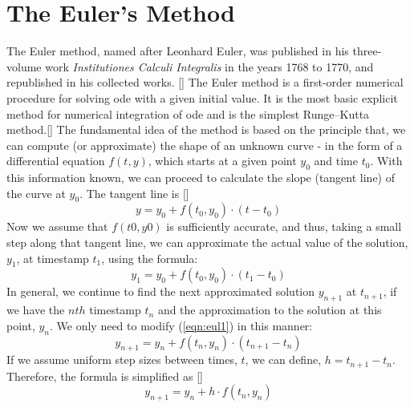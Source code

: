 \documentclass[12pt,oneside]{book}
\begin{document}
	\section{The Euler's Method} \label{m:eul}
		\begin{spacing}{1.2}
			
			The Euler method, named after Leonhard Euler, was published in his three-volume work \textit{Institutiones Calculi Integralis} in the years 1768 to 1770, and republished in his collected works.\citep{euler1913institutiones} [] The Euler method is a first-order numerical procedure for solving \ac{ode} with a given initial value. It is the most basic explicit method for numerical integration of \ac{ode} and is the simplest Runge–Kutta method.[] \newline
			The fundamental idea of the method is based on the principle that, we can compute (or approximate) the shape of an unknown curve - in the form of a differential equation $ f(t,y) $, which starts at a given point $ y_{0} $ and time $ t_{0} $. With this information known, we can proceed to calculate the slope (tangent line) of the curve at $ y_{0} $. \newline
			The tangent line is []
			\begin{equation*}
				y = y_{0} + f(t_{0}, y_{0}) \cdot (t - t_{0})
			\end{equation*}
			Now we assume that $ f(t0, y0) $ is sufficiently accurate, and thus, taking a small step along that tangent line, we can approximate the actual value of the solution, $ y_{1} $, at timestamp $ t_{1} $, using the formula:
			\begin{equation} \label{eqn:eul1}
				y_{1} = y_{0} + f(t_{0}, y_{0}) \cdot (t_{1} - t_{0})
			\end{equation}
			In general, we continue to find the next approximated solution $ y_{n+1} $ at $ t_{n+1} $, if we have the $ nth $ timestamp $ t_{n} $ and the approximation to the solution at this point, $ y_{n} $. We only need to modify (\ref{eqn:eul1}) in this manner:
			\begin{equation} \tag{2.2a}
				y_{n+1} = y_{n} + f(t_{n}, y_{n}) \cdot (t_{n+1} - t_{n})
			\end{equation}
			If we assume uniform step sizes between times, $ t $, we can define, $ h = t_{n+1} - t_{n} $. Therefore, the formula is simplified as []
			\begin{equation} \label{eqn:eul} \tag{2.2b}
				y_{n+1} = y_{n} + h \cdot f(t_{n}, y_{n})
			\end{equation}
			

\end{spacing}
\end{document}
